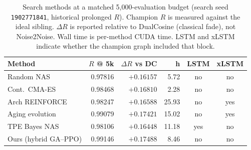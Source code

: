 \begin{table}[t]
  \centering
  \caption{Search methods at a matched 5,000-evaluation budget (search seed \texttt{1902771841}, historical prolonged $R$).
    Champion $R$ is measured against the ideal sibling. $\Delta R$ is reported relative to DualCosine (classical fade), not Noise2Noise.
    Wall time is per-method CUDA time. LSTM and xLSTM indicate whether the champion graph included that block.}
  \label{tab:meta-approaches}
  \setlength{\tabcolsep}{2pt}
  \scriptsize
  \begin{tabular}{@{}lrrrcc@{}}
    \toprule
    Method & $R$ @ 5k & $\Delta R$ vs DC & h & LSTM & xLSTM \\
    \midrule
    Random NAS & 0.97816 & $+0.16157$ & 5.72 & no & no \\
    Cont.\ CMA-ES & 0.98468 & $+0.16810$ & 2.28 & no & no \\
    Arch REINFORCE & 0.98247 & $+0.16588$ & 25.93 & no & yes \\
    Aging evolution & 0.99079 & $+0.17421$ & 15.02 & no & yes \\
    TPE Bayes NAS & 0.98106 & $+0.16448$ & 11.18 & yes & no \\
    Ours (hybrid GA--PPO) & 0.99146 & $+0.17488$ & 8.46 & no & no \\
    \bottomrule
  \end{tabular}
\end{table}

